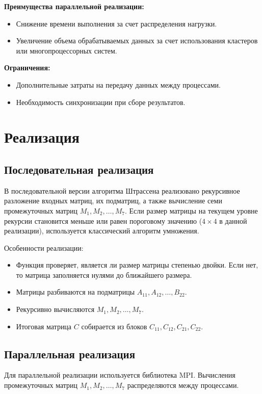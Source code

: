 \documentclass[a4paper, 14pt]{extarticle}
\begin{document}
\textbf{Преимущества параллельной реализации:}
\begin{itemize}
    \item Снижение времени выполнения за счет распределения нагрузки.
    \item Увеличение объема обрабатываемых данных за счет использования кластеров или многопроцессорных систем.
\end{itemize}

\textbf{Ограничения:}
\begin{itemize}
    \item Дополнительные затраты на передачу данных между процессами.
    \item Необходимость синхронизации при сборе результатов.
\end{itemize}

    \newpage
    \section{Реализация}
\subsection{Последовательная реализация}
В последовательной версии алгоритма Штрассена реализовано рекурсивное разложение входных матриц, их подматриц, а также вычисление семи промежуточных матриц \(M_1, M_2, \dots, M_7\). Если размер матрицы на текущем уровне рекурсии становится меньше или равен пороговому значению (\(4 \times 4\) в данной реализации), используется классический алгоритм умножения.

Особенности реализации:
\begin{itemize}
    \item Функция проверяет, является ли размер матрицы степенью двойки. Если нет, то матрица заполняется нулями до ближайшего размера.
    \item Матрицы разбиваются на подматрицы \(A_{11}, A_{12}, \dots, B_{22}\).
    \item Рекурсивно вычисляются \(M_1, M_2, \dots, M_7\).
    \item Итоговая матрица \(C\) собирается из блоков \(C_{11}, C_{12}, C_{21}, C_{22}\).
\end{itemize}

\subsection{Параллельная реализация}
Для параллельной реализации используется библиотека MPI. Вычисления промежуточных матриц \(M_1, M_2, \dots, M_7\) распределяются между процессами.
\end{document}
